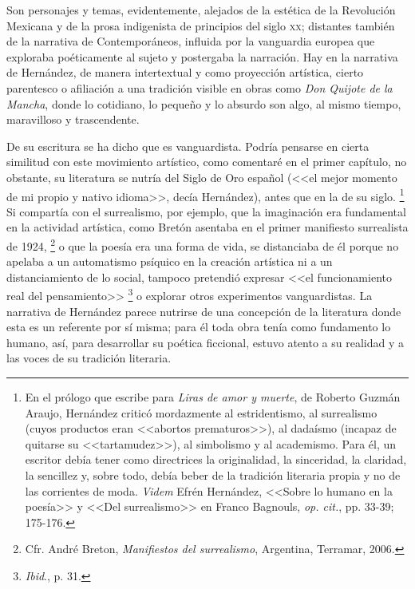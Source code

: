 \documentclass[14pt,twoside,final]{extbook} %
\let\oldfootnote\footnote
\renewcommand\footnote[1]{%
\oldfootnote{\hspace{1mm}#1}}
\begin{document}
Son personajes y temas, evidentemente, alejados de la estética de la Revolución Mexicana y de la prosa indigenista de principios del siglo \textsc{xx}; distantes
también de la narrativa de Contemporáneos, influida por la vanguardia europea que exploraba poéticamente al sujeto y postergaba la narración. Hay en la narrativa de Hernández, de manera intertextual y como proyección artística, cierto parentesco o afiliación a una tradición visible en obras como \emph{Don Quijote de la Mancha}, donde lo cotidiano, lo pequeño y lo absurdo son algo, al mismo tiempo, maravilloso y
trascendente.

De su escritura se ha dicho que es vanguardista. Podría pensarse en cierta similitud con este movimiento artístico, como comentaré en el primer capítulo, no obstante, su literatura se nutría del Siglo de Oro español (<<el mejor momento de mi propio y nativo idioma>>, decía Hernández), antes que en la de su siglo.\footnote{En el prólogo que escribe para \emph{Liras de amor y muerte}, de Roberto Guzmán Araujo, Hernández criticó mordazmente al estridentismo, al surrealismo (cuyos productos eran <<abortos prematuros>>), al dadaísmo (incapaz de quitarse su <<tartamudez>>), al simbolismo y al academismo. Para él, un escritor debía tener como directrices la originalidad, la sinceridad, la claridad, la sencillez y, sobre todo, debía beber de la tradición literaria propia y no de las corrientes de moda. \emph{Videm} Efrén Hernández, <<Sobre lo humano en la poesía>> y <<Del surrealismo>> en Franco Bagnouls, \emph{op. cit.}, pp. 33-39; 175-176.} Si compartía con el surrealismo, por ejemplo, que la imaginación era fundamental en la actividad artística, como Bretón asentaba en el primer manifiesto surrealista de 1924,\footnote{Cfr. André Breton, \emph{Manifiestos del surrealismo}, Argentina, Terramar, 2006.} o que la poesía era una forma de vida, se distanciaba de él porque no apelaba a un automatismo psíquico en la creación artística ni a un distanciamiento de lo social, tampoco pretendió expresar <<el funcionamiento real del pensamiento>>\footnote{\emph{Ibid}., p. 31.} o explorar otros experimentos vanguardistas. La narrativa de Hernández parece nutrirse de una concepción de la literatura donde esta es un referente por sí misma; para él toda obra tenía como fundamento lo humano, así, para desarrollar su poética ficcional, estuvo atento a su realidad y a las voces de su tradición literaria.
\end{document}
